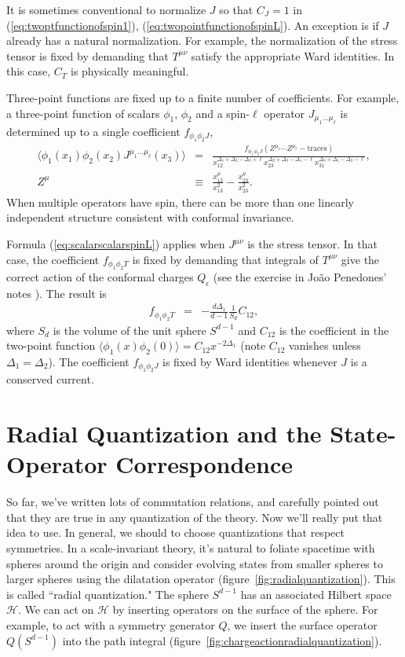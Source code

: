 \documentclass[11pt]{ws-rv9x6}
\newcommand\be{\begin{eqnarray}}
\newcommand\ee{\end{eqnarray}}
\newcommand\f\phi
\newcommand\e\epsilon
\newcommand\<\langle
\renewcommand\>\rangle
\newcommand\nn{\nonumber}
\renewcommand\.{\cdot}
\newcommand\De{\Delta}
\newcommand\cH{\mathcal{H}}
\begin{document}
It is sometimes conventional to normalize $J$ so that $C_J=1$ in (\ref{eq:twoptfunctionofspin1}), (\ref{eq:twopointfunctionofspinL}).  An exception is if $J$ already has a natural normalization.  For example, the normalization of the stress tensor is fixed by demanding that $T^{\mu\nu}$ satisfy the appropriate Ward identities.  In this case, $C_T$ is physically meaningful.

Three-point functions are fixed up to a finite number of coefficients.  For example, a three-point function of scalars $\phi_{1}$, $\phi_2$ and a spin-$\ell$ operator $J_{\mu_1\dots\mu_\ell}$ is determined up to a single coefficient $f_{\f_1\f_2 J}$,
\be
\label{eq:scalarscalarspinL}
\<\f_1(x_1)\f_2(x_2)J^{\mu_1\dots\mu_\ell}(x_3)\> &=& \frac{f_{\f_1\f_2 J}(Z^{\mu_1}\cdots Z^{\mu_\ell} - \mathrm{traces})}{x_{12}^{\De_1+\De_2-\De_3+\ell}x_{23}^{\De_2+\De_3-\De_1-\ell}x_{31}^{\De_3+\De_1-\De_2-\ell}},\nn\\
Z^\mu &\equiv& \frac{x_{13}^\mu}{x_{13}^2}-\frac{x_{23}^\mu}{x_{23}^2}.
\ee
When multiple operators have spin, there can be more than one linearly independent structure consistent with conformal invariance.

Formula (\ref{eq:scalarscalarspinL}) applies when $J^{\mu\nu}$ is the stress tensor.  In that case, the coefficient $f_{\phi_1\phi_2 T}$ is fixed by demanding that integrals of $T^{\mu\nu}$ give the correct action of the conformal charges $Q_\e$ (see the exercise in Jo\~ao Penedones' notes \cite{Joao}). The result is 
\be
\label{eq:stresstensorward}
f_{\phi_1\phi_2 T} &=& -\frac{d\De_1}{d-1}\frac 1 {S_d} C_{12},
\ee
where $S_d$ is the volume of the unit sphere $S^{d-1}$ and $C_{12}$ is the coefficient in the two-point function $\<\phi_1(x)\phi_2(0)\>=C_{12}x^{-2\De_1}$ (note $C_{12}$ vanishes unless $\Delta_1=\Delta_2$). The coefficient $f_{\phi_1\phi_2 J}$ is fixed by Ward identities whenever $J$ is a conserved current.

\section{Radial Quantization and the State-Operator Correspondence}


So far, we've written lots of commutation relations, and carefully pointed out that they are true in any quantization of the theory. Now we'll really put that idea to use.  In general, we should to choose quantizations that respect symmetries.  In a scale-invariant theory, it's natural to foliate spacetime with spheres around the origin and consider evolving states from smaller spheres to larger spheres using the dilatation operator (figure~\ref{fig:radialquantization}).  This is called ``radial quantization." The sphere $S^{d-1}$ has an associated Hilbert space $\cH$. We can act on $\cH$ by inserting operators on the surface of the sphere. For example, to act with a symmetry generator $Q$, we insert the surface operator $Q(S^{d-1})$ into the path integral (figure~\ref{fig:chargeactionradialquantization}).
\end{document}

